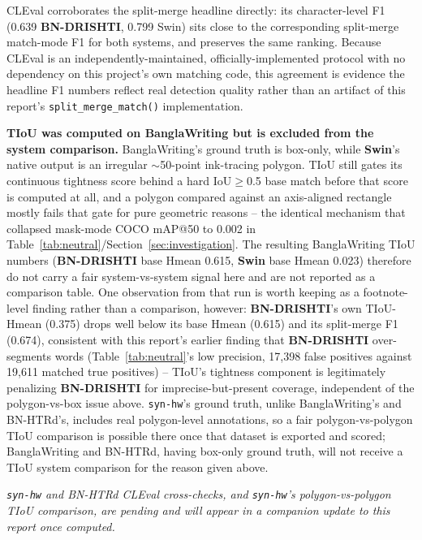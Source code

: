 \documentclass[11pt]{article}
\newcommand{\swin}{\textbf{Swin}}
\newcommand{\bnd}{\textbf{BN-DRISHTI}}
\begin{document}
CLEval corroborates the split-merge headline directly: its character-level F1 (0.639
\bnd{}, 0.799 Swin) sits close to the corresponding split-merge match-mode F1 for both
systems, and preserves the same ranking. Because CLEval is an independently-maintained,
officially-implemented protocol with no dependency on this project's own matching code,
this agreement is evidence the headline F1 numbers reflect real detection quality rather
than an artifact of this report's \texttt{split\_merge\_match()} implementation.

\textbf{TIoU was computed on BanglaWriting but is excluded from the system comparison.}
BanglaWriting's ground truth is box-only, while \swin's native output is an irregular
$\sim$50-point ink-tracing polygon. TIoU still gates its continuous tightness score behind
a hard IoU$\geq$0.5 base match before that score is computed at all, and a polygon
compared against an axis-aligned rectangle mostly fails that gate for pure geometric
reasons -- the identical mechanism that collapsed mask-mode COCO mAP@50 to 0.002 in
Table~\ref{tab:neutral}/Section~\ref{sec:investigation}. The resulting BanglaWriting TIoU
numbers (\bnd{} base Hmean 0.615, \swin{} base Hmean 0.023) therefore do not carry a fair
system-vs-system signal here and are not reported as a comparison table. One observation
from that run is worth keeping as a footnote-level finding rather than a comparison,
however: \bnd's own TIoU-Hmean (0.375) drops well below its base Hmean (0.615) and its
split-merge F1 (0.674), consistent with this report's earlier finding that \bnd{}
over-segments words (Table~\ref{tab:neutral}'s low precision, 17{,}398 false positives
against 19{,}611 matched true positives) -- TIoU's tightness component is legitimately
penalizing \bnd{} for imprecise-but-present coverage, independent of the polygon-vs-box
issue above. \texttt{syn-hw}'s ground truth, unlike BanglaWriting's and BN-HTRd's, includes
real polygon-level annotations, so a fair polygon-vs-polygon TIoU comparison is possible
there once that dataset is exported and scored; BanglaWriting and BN-HTRd, having box-only
ground truth, will not receive a TIoU system comparison for the reason given above.

\textit{\texttt{syn-hw} and BN-HTRd CLEval cross-checks, and \texttt{syn-hw}'s
polygon-vs-polygon TIoU comparison, are pending and will appear in a companion update to
this report once computed.}
\end{document}
